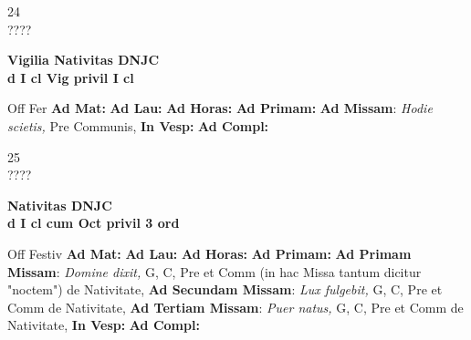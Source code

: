 \documentclass[10pt, openany]{book}
\begin{document}
    \begin{center}
        \begin{minipage}{3.5in}
            \vspace{2em}
            \begin{minipage}{0.5in}
                {\Huge 24} \\
                {\normalsize ????}
            \end{minipage}
            \begin{minipage}{3.0in}
                \textbf{ \large Vigilia Nativitas DNJC \\
                \textnormal{\normalsize d I cl Vig privil I cl}}

            \end{minipage}
            \begin{justify}Off Fer
                \textbf{Ad Mat: }
                \textbf{Ad Lau: }
                \textbf{Ad Horas: }
                \textbf{Ad Primam: }\textbf{Ad Missam}: \textit{Hodie scietis,} Pre Communis, 
                \textbf{In Vesp: }
                \textbf{Ad Compl: }
            \end{justify}
        \end{minipage}
    \end{center}

    \begin{center}
        \begin{minipage}{3.5in}
            \vspace{2em}
            \begin{minipage}{0.5in}
                {\Huge 25} \\
                {\normalsize ????}
            \end{minipage}
            \begin{minipage}{3.0in}
                \textbf{ \large Nativitas DNJC \\
                \textnormal{\normalsize d I cl cum Oct privil 3 ord}}

            \end{minipage}
            \begin{justify}Off Festiv
                \textbf{Ad Mat: }
                \textbf{Ad Lau: }
                \textbf{Ad Horas: }
                \textbf{Ad Primam: }\textbf{Ad Primam Missam}: \textit{Domine dixit,} G, C, Pre et Comm (in hac Missa tantum dicitur "noctem") de Nativitate, \textbf{Ad Secundam Missam}: \textit{Lux fulgebit,} G, C, Pre et Comm de Nativitate, \textbf{Ad Tertiam Missam}: \textit{Puer natus,} G, C, Pre et Comm de Nativitate, 
                \textbf{In Vesp: }
                \textbf{Ad Compl: }
            \end{justify}
        \end{minipage}
    \end{center}
\end{document}
